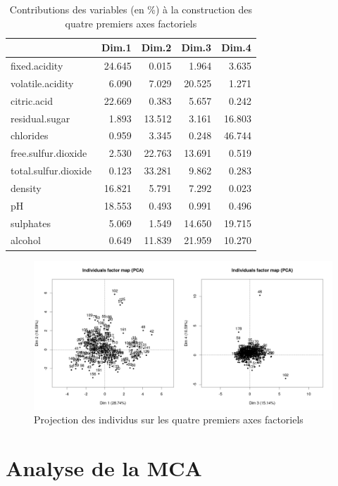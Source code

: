\documentclass[11pt,a4paper]{article}
\begin{document}
\begin{table}[h]
	\centering
	\begin{tabular}{lrrrr}
		\hline
		& Dim.1 & Dim.2 & Dim.3 & Dim.4 \\ 
		\hline
		fixed.acidity & 24.645 & 0.015 & 1.964 & 3.635 \\ 
		volatile.acidity & 6.090 & 7.029 & 20.525 & 1.271 \\ 
		citric.acid & 22.669 & 0.383 & 5.657 & 0.242 \\ 
		residual.sugar & 1.893 & 13.512 & 3.161 & 16.803 \\ 
		chlorides & 0.959 & 3.345 & 0.248 & 46.744 \\ 
		free.sulfur.dioxide & 2.530 & 22.763 & 13.691 & 0.519 \\ 
		total.sulfur.dioxide & 0.123 & 33.281 & 9.862 & 0.283 \\ 
		density & 16.821 & 5.791 & 7.292 & 0.023 \\ 
		pH & 18.553 & 0.493 & 0.991 & 0.496 \\ 
		sulphates & 5.069 & 1.549 & 14.650 & 19.715 \\ 
		alcohol & 0.649 & 11.839 & 21.959 & 10.270 \\ 
		\hline
	\end{tabular}
\caption{Contributions des variables (en \%) à la construction des quatre premiers axes factoriels }
\label{table:pcacontrib}
\end{table}

\begin{figure}[h]
	\includegraphics[width=\textwidth, keepaspectratio]{pcaind}
	\caption{Projection des individus sur les quatre premiers axes factoriels}
	\label{fig:pcaind}
\end{figure}
\FloatBarrier
\section{Analyse de la MCA}
\end{document}
